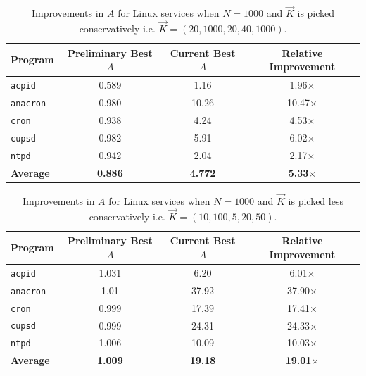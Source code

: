 \begin{table} [h]
\begin{center}
\begin{tabular}{|l||c|c||c||}\hline
  Program & Preliminary Best $A$ & Current Best $A$ & Relative Improvement \\\hline \hline
  \texttt{acpid} & 0.589 & 1.16 & 1.96$\times$  \\\hline  
  \texttt{anacron} & 0.980 & 10.26 & 10.47$\times$  \\\hline  
  \texttt{cron} & 0.938 & 4.24 & 4.53$\times$  \\\hline
  \texttt{cupsd} & 0.982 & 5.91 & 6.02$\times$  \\\hline
  \texttt{ntpd} & 0.942 & 2.04 & 2.17$\times$  \\\hline \hline 
  \textbf{Average} & \textbf{0.886} & \textbf{4.772} & {\bf 5.33$\times$}  \\\hline
\end{tabular}
\caption{Improvements in $A$ for Linux services
  when $N = 1000$ and $\vec K$ is 
  picked conservatively i.e. $\vec K = (20, 1000, 20, 40, 1000)$.}
\label{evalsummarytbl1}
\end{center}
\end{table}

\begin{table} [h]
\begin{center}
\begin{tabular}{|l||c|c||c||}\hline
  Program & Preliminary Best $A$ & Current Best $A$ & Relative Improvement \\\hline \hline
  \texttt{acpid} & 1.031 & 6.20 & 6.01$\times$  \\\hline  
  \texttt{anacron} & 1.01 & 37.92 & 37.90$\times$  \\\hline  
  \texttt{cron} & 0.999 & 17.39 & 17.41$\times$  \\\hline
  \texttt{cupsd} & 0.999 & 24.31 & 24.33$\times$  \\\hline
  \texttt{ntpd} & 1.006 & 10.09 & 10.03$\times$  \\\hline \hline 
  \textbf{Average} & \textbf{1.009} & \textbf{19.18} & {\bf 19.01$\times$}  \\\hline
\end{tabular}
\caption{Improvements in $A$ for Linux services
  when $N = 1000$ and $\vec K$ is 
  picked less conservatively i.e. $\vec K = (10, 100, 5, 20, 50)$.}
\label{evalsummarytbl2}
\end{center}
\end{table}


